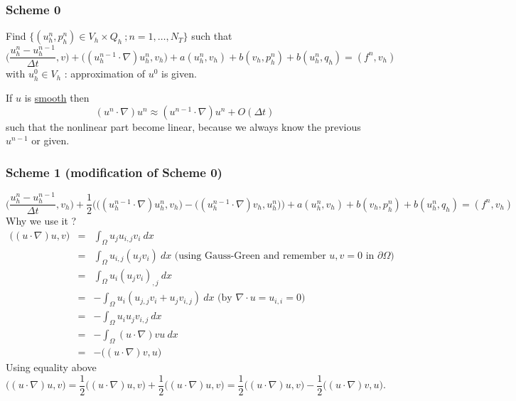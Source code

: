 \documentclass[a4paper,10pt]{article}
\begin{document}
\subsubsection{Scheme 0}
Find $ \{ (u_{h}^{n},p_{h}^{n}) \in V_{h}\times Q_{h} \ ; n=1, \dots, N_{T} \} $ such that
\begin{equation}\label{NS_Sch_0}
\big( \dfrac{u_{h}^{n}-u_{h}^{n-1}}{\Delta t},v\big) + \big((u_{h}^{n-1} \cdot \nabla)u_{h}^{n},v_{h} \big) + a(u_{h}^{n},v_{h}) + b(v_{h},p_{h}^{n}) + b(u_{h}^{n},q_{h}) = (f^{n},v_{h})
\end{equation}
with $ u_{h}^{0} \in V_{h} $ : approximation of $ u^{0} $ is given.

If $ u $ is \underline{smooth} then
\[ (u^{n}\cdot \nabla) u^{n} \approx (u^{n-1}\cdot \nabla) u^{n} + O(\Delta t) \]
such that the nonlinear part become linear, because we always know the previous $ u^{n-1} $ or given.

\subsubsection{Scheme 1 (modification of Scheme 0)}
\begin{equation}\label{NS_Sch_1}
\big( \dfrac{u_{h}^{n}-u_{h}^{n-1}}{\Delta t},v_{h}\big) + \dfrac{1}{2} \Big( \big((u_{h}^{n-1} \cdot \nabla)u_{h}^{n},v_{h}\big) - \big((u_{h}^{n-1} \cdot \nabla)v_{h},u_{h}^{n}\big) \Big) + a(u_{h}^{n},v_{h}) + b(v_{h},p_{h}^{n}) + b(u_{h}^{n},q_{h}) = (f^{n},v_{h})
\end{equation}
Why we use it ?
\begin{eqnarray}\nonumber
\big((u \cdot \nabla) u , v\big) &=& \int_{\Omega} u_{j} u_{i,j} v_{i} \ dx \\ \nonumber
&=& \int_{\Omega} u_{i,j} (u_{j}v_{i}) \ dx \text{ (using Gauss-Green and remember } u,v=0 \text{ in } \partial\Omega)\\ \nonumber
&=& \int_{\Omega} u_{i} (u_{j}v_{i})_{,j} \ dx \\ \nonumber
&=& - \int_{\Omega} u_{i} (u_{j,j}v_{i}+u_{j}v_{i,j}) \ dx \text{ (by } \nabla \cdot u = u_{i,i} = 0 ) \\ \nonumber
&=& - \int_{\Omega} u_{i} u_{j}v_{i,j} \ dx \\ \nonumber
&=& - \int_{\Omega} (u \cdot \nabla) v u \ dx \\ \nonumber
&=& - \big((u \cdot \nabla) v , u\big)
\end{eqnarray}
Using equality above
\[ \big( (u \cdot \nabla) u,v \big) = \dfrac{1}{2}\big( (u \cdot \nabla) u,v \big) + \dfrac{1}{2} \big( (u \cdot \nabla) u,v \big) = \dfrac{1}{2}\big( (u \cdot \nabla) u,v \big) - \dfrac{1}{2}\big( (u \cdot \nabla) v,u \big). \]
\end{document}

